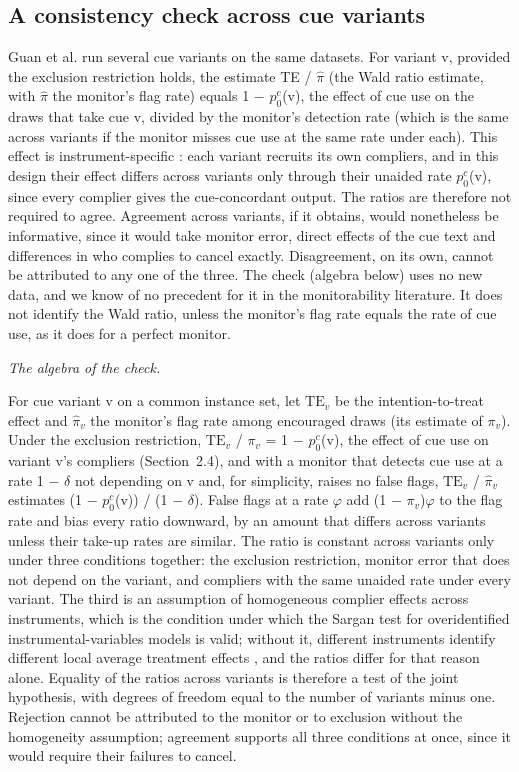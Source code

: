 \documentclass[11pt]{article}
\begin{document}
\subsection{A consistency check across cue variants}
Guan et al. run several cue variants on the same datasets. For variant v, provided the exclusion restriction holds, the estimate TE / $\hat{\pi}$ (the Wald ratio estimate, with $\hat{\pi}$ the monitor’s flag rate) equals 1 $-$ $p_0^{c}$(v), the effect of cue use on the draws that take cue v, divided by the monitor’s detection rate (which is the same across variants if the monitor misses cue use at the same rate under each). This effect is instrument-specific \citep{imbens1994identification}: each variant recruits its own compliers, and in this design their effect differs across variants only through their unaided rate $p_0^{c}$(v), since every complier gives the cue-concordant output. The ratios are therefore not required to agree. Agreement across variants, if it obtains, would nonetheless be informative, since it would take monitor error, direct effects of the cue text and differences in who complies to cancel exactly. Disagreement, on its own, cannot be attributed to any one of the three. The check (algebra below) uses no new data, and we know of no precedent for it in the monitorability literature. It does not identify the Wald ratio, unless the monitor’s flag rate equals the rate of cue use, as it does for a perfect monitor.

\emph{The algebra of the check.}

For cue variant v on a common instance set, let $\mathrm{TE}_v$ be the intention-to-treat effect and $\hat{\pi}_v$ the monitor’s flag rate among encouraged draws (its estimate of $\pi_v$). Under the exclusion restriction, $\mathrm{TE}_v$ / $\pi_v$ = 1 $-$ $p_0^{c}$(v), the effect of cue use on variant v’s compliers (Section~2.4), and with a monitor that detects cue use at a rate 1 $-$ $\delta$ not depending on v and, for simplicity, raises no false flags, $\mathrm{TE}_v$ / $\hat{\pi}_v$ estimates (1 $-$ $p_0^{c}$(v)) / (1 $-$ $\delta$). False flags at a rate $\varphi$ add (1 $-$ $\pi_v$)$\varphi$ to the flag rate and bias every ratio downward, by an amount that differs across variants unless their take-up rates are similar. The ratio is constant across variants only under three conditions together: the exclusion restriction, monitor error that does not depend on the variant, and compliers with the same unaided rate under every variant. The third is an assumption of homogeneous complier effects across instruments, which is the condition under which the Sargan test for overidentified instrumental-variables models is valid; without it, different instruments identify different local average treatment effects \citep{imbens1994identification}, and the ratios differ for that reason alone. Equality of the ratios across variants is therefore a test of the joint hypothesis, with degrees of freedom equal to the number of variants minus one. Rejection cannot be attributed to the monitor or to exclusion without the homogeneity assumption; agreement supports all three conditions at once, since it would require their failures to cancel.
\end{document}
